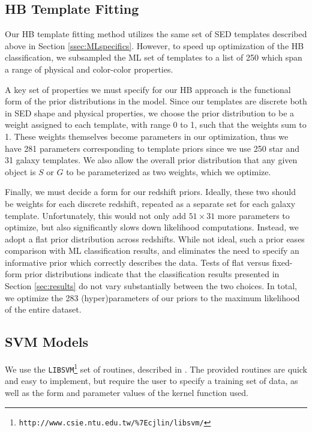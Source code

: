\documentclass[12pt,preprint]{aastex}
\begin{document}
\subsection{HB Template Fitting}
\label{ssec:HBspecifics}

Our HB template fitting method utilizes the same set of SED templates 
described above in Section \ref{ssec:MLspecifics}.  However, to speed 
up optimization of the HB classification, we subsampled the ML set of 
templates to a list of 250 which span a range of physical and color-color 
properties.

A key set of properties we must specify for our HB approach is the 
functional form of the prior distributions in the model.  Since our 
templates are discrete both in SED shape and physical properties, we 
choose the prior distribution to be a weight assigned to each template, 
with range 0 to 1, such that the weights sum to 1.  These weights themselves 
become parameters in our optimization, thus we have 281 parameters 
corresponding to template priors since we use 250 star and 31 galaxy 
templates.  We also allow the overall prior distribution that any given object 
is $S$ or $G$ to be parameterized as two weights, which we optimize.

Finally, we must decide a form for our redshift priors.  Ideally, these two 
should be weights for each discrete redshift, repeated as a separate set 
for each galaxy template.  Unfortunately, this would not only add 
$51\times31$ more parameters to optimize, but also significantly slows 
down likelihood computations.  Instead, we adopt a flat prior distribution 
across redshifts.  While not ideal, such a prior eases comparison with 
ML classification results, and eliminates the need to specify an informative 
prior which correctly describes the data.  Tests of flat versus fixed-form 
prior distributions indicate that the classification results presented in 
Section \ref{sec:results} do not vary substantially between the two choices.  
In total, we optimize the 283 (hyper)parameters of our priors to the maximum 
likelihood of the entire dataset.

\subsection{SVM Models}

We use the \texttt{LIBSVM}\footnote{\tt http://www.csie.ntu.edu.tw/\%7Ecjlin/libsvm/} set 
of routines, described in \citet{chang11a}.  The provided routines 
are quick and easy to implement, but require the user to specify a 
training set of data, as well as the form and parameter values of the 
kernel function used. 
\end{document}
